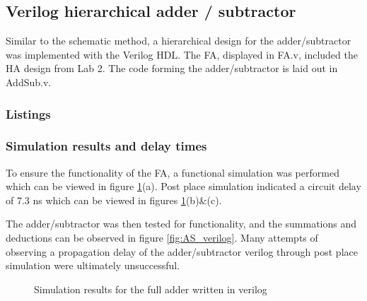 \documentclass[11pt]{article}
\begin{document}
\subsection{Verilog hierarchical adder / subtractor}

Similar to the schematic method, a hierarchical design for the adder/subtractor was implemented with the Verilog HDL. The FA, displayed in FA.v, included the HA design from Lab 2. The code forming the adder/subtractor is laid out in AddSub.v.

\subsubsection{Listings}



\subsubsection{Simulation results and delay times}

To ensure the functionality of the FA, a functional simulation was performed which can be viewed in figure \ref{fig:FA_verilog}(a). Post place simulation indicated a circuit delay of 7.3 ns which can be viewed in figures \ref{fig:FA_verilog}(b)\&(c).

The adder/subtractor was then tested for functionality, and the summations and deductions can be observed in figure \ref{fig:AS_verilog}. Many attempts of observing a propagation delay of the adder/subtractor verilog through post place simulation were ultimately unsuccessful. 

\begin{figure}[htpb]
	\centering
	\caption{Simulation results for the full adder written in verilog}
	\label{fig:FA_verilog}
\end{figure}
\end{document}
